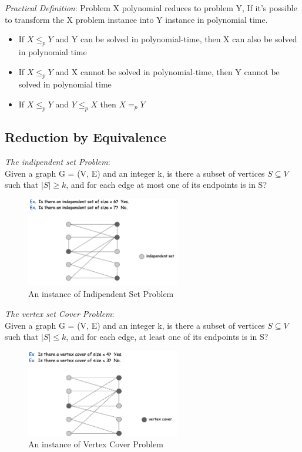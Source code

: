 \documentclass[11pt]{article}
\begin{document}
\emph{Practical Definition}: Problem X polynomial reduces to problem Y, If it's possible to transform the X problem instance into Y instance in polynomial time.

\begin{itemize}
\item{If $X \leq_{p} Y$ and Y can be solved in polynomial-time, then X can also be solved in polynomial time}
\item{If $X \leq_{p} Y$ and X cannot be solved in polynomial-time, then Y cannot be solved in polynomial time}
\item{If $X \leq_{p} Y$ and $Y \leq_{p} X$ then $X =_{p} Y$}
\end{itemize}

\subsection{Reduction by Equivalence}

\emph{The indipendent set Problem}:\\

Given a graph G = (V, E) and an integer k, is there a subset of vertices $S \subseteq V$ such that $|S| \geq k$, and for each edge at most one of its endpoints is in S?

\begin{figure}[H]
		\centering
		\includegraphics[width=0.6\textwidth ]{indipendent}
		\caption{An instance of Indipendent Set Problem}
\end{figure}

\emph{The vertex set Cover Problem}:\\

Given a graph G = (V, E) and an integer k, is there a subset of vertices $S \subseteq V$ such that $|S| \leq k$, and for each edge, at least one of its endpoints is in S?

\begin{figure}[H]
		\centering
		\includegraphics[width=0.6\textwidth ]{vertexCover}
		\caption{An instance of Vertex Cover Problem}
\end{figure}
\end{document}

